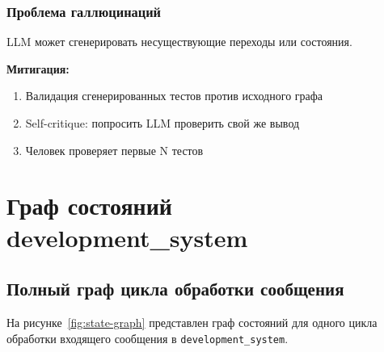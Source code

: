 \documentclass[12pt, a4paper, twoside]{article}
\begin{document}
\subsubsection{Проблема галлюцинаций}

LLM может сгенерировать несуществующие переходы или состояния.

\textbf{Митигация:}
\begin{enumerate}[leftmargin=1.5em]
  \item Валидация сгенерированных тестов против исходного графа
  \item Self-critique: попросить LLM проверить свой же вывод
  \item Человек проверяет первые N тестов
\end{enumerate}

\section{Граф состояний development\_system}

\subsection{Полный граф цикла обработки сообщения}

На рисунке~\ref{fig:state-graph} представлен граф состояний для одного
цикла обработки входящего сообщения в \texttt{development\_system}.
\end{document}

